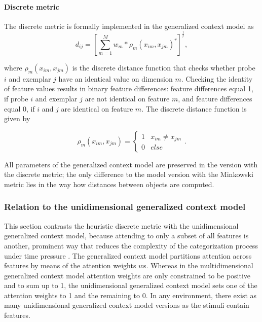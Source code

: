 \documentclass[a4paper,man,natbib]{apa6}
\begin{document}
\paragraph{Discrete metric}
The discrete metric is formally implemented in the generalized context model as 
\begin{equation}
d_{ij} = \left[\sum\limits_{m=1}^M w_{m}* \rho_{m}(x_{im}, x_{jm}) ^r\right]^\frac{1}{r},
\label{eq:distance}
\end{equation}

where $\rho_{m}(x_{im}, x_{jm})$ is the discrete distance function that checks whether probe $i$ and exemplar $j$ have an identical value on dimension $m$. Checking the identity of feature values results in binary feature differences: feature differences equal 1, if probe $i$ and exemplar $j$ are not identical on feature $m$, and feature differences equal 0, if $i$ and $j$ are identical on feature $m$. The discrete distance function is given by

\begin{equation}
\rho_{m}(x_{im}, x_{jm}) = 
\begin{cases}
	1 & x_{im} \neq x_{jm} \\
	0 & else 
\end{cases}.
\end{equation}

All parameters of the generalized context model are preserved in the version with the discrete metric; the only difference to the model version with the Minkowski metric lies in the way how distances between objects are computed.

\subsubsection{Relation to the unidimensional generalized context model}
This section contrasts the heuristic discrete metric with the unidimensional generalized context model, because attending to only a subset of all features is another, prominent way that reduces the complexity of the categorization process under time pressure \citep{lamberts1995categorization, lamberts1998time, lamberts1999building, lamberts1999categorization, lamberts1997fast}. 
The generalized context model \citep{nosofsky1989further} partitions attention across features by means of the attention weights $w$s. Whereas in the multidimensional generalized context model attention weights are only constrained to be positive and to sum up to 1, the unidimensional generalized context model sets one of the attention weights to 1 and the remaining to 0. In any environment, there exist as many unidimensional generalized context model versions as the stimuli contain features. 
\end{document}
